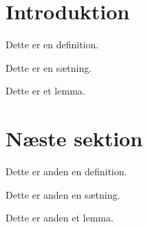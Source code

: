 
\section{Introduktion}

\begin{defn}
Dette er en definition.
\end{defn}

\begin{thm}
Dette er en sætning.
\end{thm}

\begin{lemma}
Dette er et lemma.
\end{lemma}

\section{Næste sektion}

\begin{defn}
Dette er anden en definition.
\end{defn}

\begin{thm}
Dette er anden en sætning.
\end{thm}

\begin{lemma}
Dette er anden et lemma.
\end{lemma}

